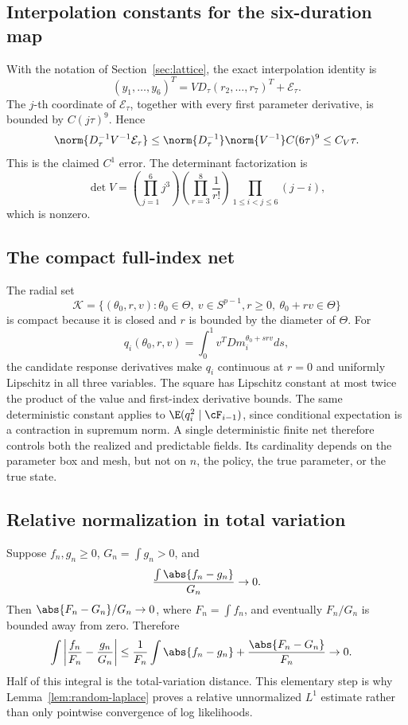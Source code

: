 \subsection{Interpolation constants for the six-duration map}

With the notation of Section~\ref{sec:lattice}, the exact interpolation
identity is
\[
 (y_1,\ldots,y_6)^T
 =VD_\tau(r_2,\ldots,r_7)^T+\mathcal E_\tau.
\]
The \(j\)-th coordinate of \(\mathcal E_\tau\), together with every first
parameter derivative, is bounded by \(C(j\tau)^9\).  Hence
\[
 \norm{D_\tau^{-1}V^{-1}\mathcal E_\tau}
 \le \norm{D_\tau^{-1}}\norm{V^{-1}}C(6\tau)^9
 \le C_V\tau.
\]
This is the claimed \(C^1\) error.  The determinant factorization is
\[
 \det V=\left(\prod_{j=1}^6j^3\right)
 \left(\prod_{r=3}^8\frac1{r!}\right)
 \prod_{1\le i<j\le6}(j-i),
\]
which is nonzero.

\subsection{The compact full-index net}

The radial set
\[
 \mathscr K=\{(\theta_0,r,v):\theta_0\in\Theta,\ v\in S^{p-1},
 r\ge0,\ \theta_0+rv\in\Theta\}
\]
is compact because it is closed and \(r\) is bounded by the diameter of
\(\Theta\).  For
\[
 q_i(\theta_0,r,v)=\int_0^1v^TDm_i^{\theta_0+srv}ds,
\]
the candidate response derivatives make \(q_i\) continuous at \(r=0\) and
uniformly Lipschitz in all three variables.  The square has Lipschitz constant
at most twice the product of the value and first-index derivative bounds.
The same deterministic constant applies to
\(\E(q_i^2\mid\cF_{i-1})\), since conditional expectation is a contraction in
supremum norm.  A single deterministic finite net therefore controls both the
realized and predictable fields.  Its cardinality depends on the parameter
box and mesh, but not on \(n\), the policy, the true parameter, or the true
state.

\subsection{Relative normalization in total variation}

Suppose \(f_n,g_n\ge0\), \(G_n=\int g_n>0\), and
\[
 \frac{\int\abs{f_n-g_n}}{G_n}\to0.
\]
Then \(\abs{F_n-G_n}/G_n\to0\), where \(F_n=\int f_n\), and eventually
\(F_n/G_n\) is bounded away from zero.  Therefore
\begin{align*}
 \int\left|\frac{f_n}{F_n}-\frac{g_n}{G_n}\right|
 &\le \frac1{F_n}\int\abs{f_n-g_n}
   +\frac{\abs{F_n-G_n}}{F_n}\to0.
\end{align*}
Half of this integral is the total-variation distance.  This elementary step
is why Lemma~\ref{lem:random-laplace} proves a relative unnormalized
\(L^1\) estimate rather than only pointwise convergence of log likelihoods.

